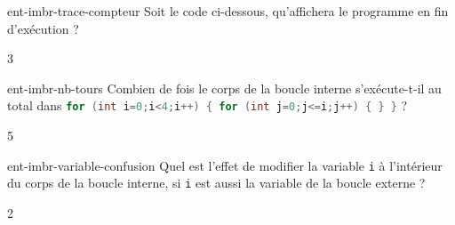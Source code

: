 
\begin{question}{ent-imbr-trace-compteur}
    Soit le code ci-dessous, qu'affichera le programme en fin d'exécution ?
    
    \begin{multicols}{3}
        \begin{reponses}
        \end{reponses}
    \end{multicols}
\end{question}

\begin{question}{ent-imbr-nb-tours}
    Combien de fois le corps de la boucle interne s'exécute-t-il au total dans \lstinline[language=C]|for (int i=0;i<4;i++) { for (int j=0;j<=i;j++) { } }| ?
    \begin{multicols}{5}
        \begin{reponses}
        \end{reponses}
    \end{multicols}
\end{question}

\begin{question}{ent-imbr-variable-confusion}
    Quel est l'effet de modifier la variable \texttt{i} à l'intérieur du corps de la boucle interne, si \texttt{i} est aussi la variable de la boucle externe ?
    \begin{multicols}{2}
        \begin{reponses}
        \end{reponses}
    \end{multicols}
\end{question}

